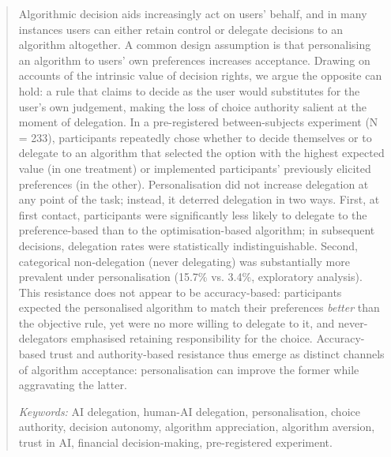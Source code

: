 \documentclass[a4paper, 12pt, fleqn]{article}
\theoremstyle{hypstyle}
\begin{document}
	\begin{abstract}
		Algorithmic decision aids increasingly act on users’ behalf, and in many instances users can either retain control or delegate decisions to an algorithm altogether. A common design assumption is that personalising an algorithm to users' own preferences increases acceptance. Drawing on accounts of the intrinsic value of decision rights, we argue the opposite can hold: a rule that claims to decide as the user would substitutes for the user's own judgement, making the loss of choice authority salient at the moment of delegation. In a pre-registered between-subjects experiment (N = 233), participants repeatedly chose whether to decide themselves or to delegate to an algorithm that selected the option with the highest expected value (in one treatment) or implemented participants' previously elicited preferences (in the other). Personalisation did not increase delegation at any point of the task; instead, it deterred delegation in two ways. First, at first contact, participants were significantly less likely to delegate to the preference-based than to the optimisation-based algorithm; in subsequent decisions, delegation rates were statistically indistinguishable. Second, categorical non-delegation (never delegating) was substantially more prevalent under personalisation (15.7\% vs. 3.4\%, exploratory analysis). 
		This resistance does not appear to be accuracy-based: participants expected the personalised algorithm to match their preferences \emph{better} than the objective rule, yet were no more willing to delegate to it, and never-delegators emphasised retaining responsibility for the choice. Accuracy-based trust and authority-based resistance thus emerge as distinct channels of algorithm acceptance: personalisation can improve the former while aggravating the latter.
		
		\vspace{.25cm}
		\textit{Keywords:} {AI delegation, human-AI delegation, personalisation, choice authority, decision autonomy, algorithm appreciation, algorithm aversion, trust in AI, financial decision-making, pre-registered experiment.}
	\end{abstract}
	
\end{document}
